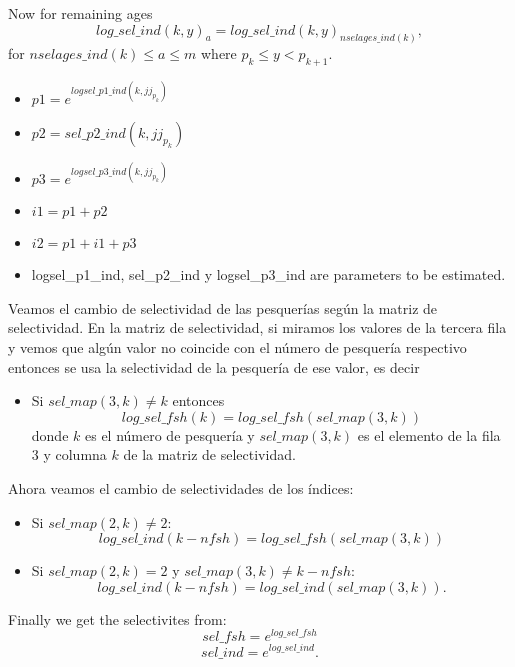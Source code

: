 \documentclass{article}
\begin{document}
\begin{itemize}
    Now for remaining ages
    \begin{equation}
         log\_sel\_ind(k,y)_a = log\_sel\_ind(k,y)_{nselages\_ind(k)},
    \end{equation}
    for $nselages\_ind(k)\leq a \leq m$ where $p_k\leq y < p_{k+1}$.
\begin{itemize}
    \item $p1 = e^{logsel\_p1\_ind(k,jj_{p_k})}$
    \item $p2 = sel\_p2\_ind(k,jj_{p_k})$
    \item $p3 = e^{logsel\_p3\_ind(k,jj_{p_k})}$
    \item $i1 = p1 + p2$
    \item $i2 = p1 + i1 + p3$
    \item logsel\_p1\_ind, sel\_p2\_ind y logsel\_p3\_ind are parameters to be estimated.
\end{itemize}
Veamos el cambio de selectividad de las pesquerías según la matriz de selectividad.
En la matriz de selectividad, si miramos los valores de la tercera fila y vemos que algún valor no coincide con el número de pesquería respectivo entonces se usa la selectividad de la pesquería de ese valor, es decir
\begin{itemize}
    \item Si $sel\_map(3,k) \neq k$ entonces
    \begin{equation}
        log\_sel\_fsh(k)=log\_sel\_fsh(sel\_map(3,k))
    \end{equation}
    donde $k$ es el número de pesquería y $sel\_map(3,k)$ es el elemento de la fila 3 y columna $k$ de la matriz de selectividad. 
\end{itemize}

Ahora veamos el cambio de selectividades de los índices:
\begin{itemize}
    \item Si $sel\_map(2,k) \neq 2$:
    \begin{equation}
        log\_sel\_ind(k-nfsh)=log\_sel\_fsh(sel\_map(3,k))
    \end{equation}
    \item Si $sel\_map(2,k) = 2$ y $sel\_map(3,k) \neq k-nfsh$:
    \begin{equation}
        log\_sel\_ind(k-nfsh) = log\_sel\_ind(sel\_map(3,k)).
    \end{equation}
\end{itemize}

   
\end{itemize}
Finally we get the selectivites from:
\begin{equation}
    sel\_fsh=e^{log\_sel\_fsh}
\end{equation}
\begin{equation}
    sel\_ind=e^{log\_sel\_ind}.
\end{equation}
\end{document}

